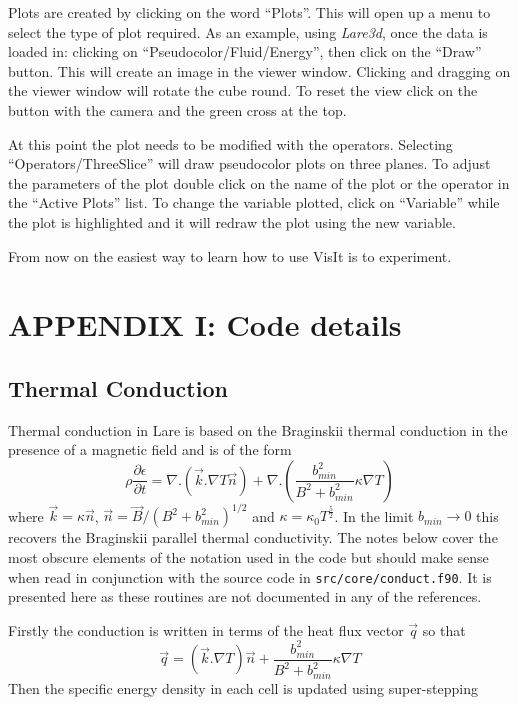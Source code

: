 \documentclass[11pt]{article}
\begin{document}
Plots are created by clicking on the word ``Plots''. This will open up a menu to select the type of plot required. As an example, using {\it Lare3d}, once the data is loaded in: clicking on ``Pseudocolor/Fluid/Energy'', then click on the ``Draw'' button. This will create an image in the viewer window. Clicking and dragging on the viewer window will rotate the cube round. To reset the view click on the button  with the camera and the green cross at the top.

At this point the plot needs to be modified with the operators. Selecting ``Operators/ThreeSlice'' will draw pseudocolor plots on three planes. To adjust the parameters of the plot double click on the name of the plot or the operator in the ``Active Plots'' list. To change the variable plotted, click on ``Variable'' while the plot is highlighted and it will redraw the plot using the new variable.

From now on the easiest way to learn how to use VisIt is to experiment.

\newpage
\section*{ APPENDIX I: Code details}
\subsection*{Thermal Conduction} %
\label{sec:thermal_code}

Thermal conduction in Lare is based on the Braginskii thermal conduction in the presence of a magnetic field and is of the form\\
\[
\rho \frac{\partial \epsilon}{\partial t} = \nabla . \left(\vec{k} . \nabla T \vec{n} \right) +  \nabla . \left(  \frac{b_{min}^2}{B^2+b_{min}^2} \kappa \nabla T \right)
\]
where $\vec{k} = \kappa \vec{n}$, $\vec{n} = \vec{B}/(B^2+b_{min}^2)^{1/2}$ and $\kappa = \kappa_0  T^\frac{5}{2}$. In the limit $b_{min}\to 0$ this recovers the Braginskii parallel thermal conductivity. The notes below cover the most obscure elements of the notation used in the code but should make sense when read in conjunction with the source code in {\tt src/core/conduct.f90}. It is presented here as these routines are not documented in any of the references.

Firstly the conduction is written in terms of the heat flux vector $\vec{q}$ so that
\[
\vec{q}= \left(\vec{k} . \nabla T \right) \vec{n} +    \frac{b_{min}^2}{B^2+b_{min}^2} \kappa \nabla T
\]
Then the specific energy density in each cell is updated using super-stepping \cite{Meyer:2012eb}
\end{document}
